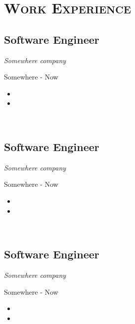 \section*{\textsc{Work Experience}}
\subsection*{Software Engineer}
\emph{Somewhere company}

\small{{\faMapMarker \space Somewhere}               \hfill      {\faCalendar {} - Now}}

\begin{itemize}
    \item \lipsumsentence[2-4]
    \item \lipsumsentence[2-4]
\end{itemize}
\\
\subsection*{Software Engineer}
\emph{Somewhere company}

\small{{\faMapMarker \space Somewhere}               \hfill      {\faCalendar {} - Now}}

\begin{itemize}
    \item \lipsumsentence[2-4]
    \item \lipsumsentence[2-4]
\end{itemize}
\\
\subsection*{Software Engineer}
\emph{Somewhere company}

\small{{\faMapMarker \space Somewhere}               \hfill      {\faCalendar {} - Now}}

\begin{itemize}
    \item \lipsumsentence[2-4]
    \item \lipsumsentence[2-4]
\end{itemize}
\\
